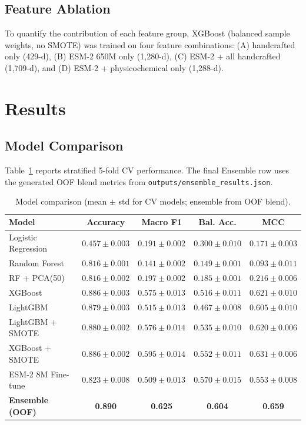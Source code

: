 \documentclass[11pt,a4paper]{article}
\begin{document}
\subsection{Feature Ablation}
To quantify the contribution of each feature group, XGBoost (balanced sample weights, no SMOTE)
was trained on four feature combinations:
(A) handcrafted only (429-d),
(B) ESM-2 650M only (1,280-d),
(C) ESM-2 + all handcrafted (1,709-d), and
(D) ESM-2 + physicochemical only (1,288-d).

\section{Results}
\subsection{Model Comparison}
Table~\ref{tab:model-comparison} reports stratified 5-fold CV performance.
The final Ensemble row uses the generated OOF blend metrics from
\texttt{outputs/ensemble\_results.json}.

\begin{table}[H]
\centering
\caption{Model comparison (mean $\pm$ std for CV models; ensemble from OOF blend).}
\label{tab:model-comparison}
\begin{tabular}{lcccc}
\toprule
Model & Accuracy & Macro F1 & Bal. Acc. & MCC \\
\midrule
Logistic Regression & $0.457 \pm 0.003$ & $0.191 \pm 0.002$ & $0.300 \pm 0.010$ & $0.171 \pm 0.003$ \\
Random Forest & $0.816 \pm 0.001$ & $0.141 \pm 0.002$ & $0.149 \pm 0.001$ & $0.093 \pm 0.011$ \\
RF + PCA(50) & $0.816 \pm 0.002$ & $0.197 \pm 0.002$ & $0.185 \pm 0.001$ & $0.216 \pm 0.006$ \\
XGBoost & $0.886 \pm 0.003$ & $0.575 \pm 0.013$ & $0.516 \pm 0.011$ & $0.621 \pm 0.010$ \\
LightGBM & $0.879 \pm 0.003$ & $0.515 \pm 0.013$ & $0.467 \pm 0.008$ & $0.605 \pm 0.010$ \\
LightGBM + SMOTE & $0.880 \pm 0.002$ & $0.576 \pm 0.014$ & $0.535 \pm 0.010$ & $0.620 \pm 0.006$ \\
XGBoost + SMOTE & $0.886 \pm 0.002$ & $0.595 \pm 0.014$ & $0.552 \pm 0.011$ & $0.631 \pm 0.006$ \\
ESM-2 8M Fine-tune & $0.823 \pm 0.008$ & $0.509 \pm 0.013$ & $0.570 \pm 0.015$ & $0.553 \pm 0.008$ \\
\textbf{Ensemble (OOF)} & \textbf{0.890} & \textbf{0.625} & \textbf{0.604} & \textbf{0.659} \\
\bottomrule
\end{tabular}
\end{table}
\end{document}
